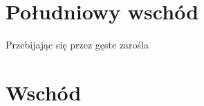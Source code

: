 \documentclass{article}
\begin{document}
    \section{Południowy wschód}

    Przebijając się przez gęste zarośla 

    \section{Wschód}


    
\end{document}
